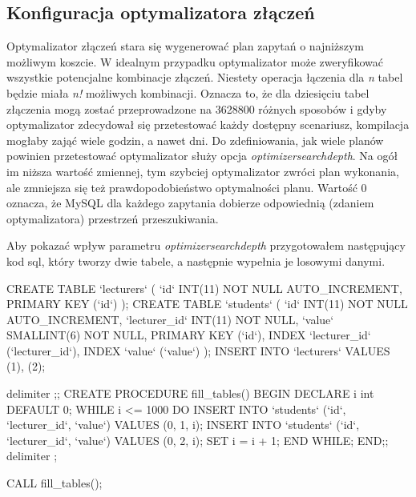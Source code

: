\subsection{Konfiguracja optymalizatora złączeń}
Optymalizator złączeń stara się wygenerować plan zapytań o najniższym możliwym koszcie. W idealnym przypadku optymalizator może zweryfikować wszystkie potencjalne kombinacje złączeń. Niestety operacja łączenia dla \textit{n} tabel będzie miała \textit{n!} możliwych kombinacji. Oznacza to, że dla dziesięciu tabel złączenia mogą zostać przeprowadzone na 3628800 różnych sposobów i gdyby optymalizator zdecydował się przetestować każdy dostępny scenariusz, kompilacja mogłaby zająć wiele godzin, a nawet dni. Do zdefiniowania, jak wiele planów powinien przetestować optymalizator służy opcja \textit{optimizer\textunderscore search\textunderscore depth}. Na ogół im niższa wartość zmiennej, tym szybciej optymalizator zwróci plan wykonania, ale zmniejsza się też prawdopodobieństwo optymalności planu. Wartość 0 oznacza, że MySQL dla każdego zapytania dobierze odpowiednią (zdaniem optymalizatora) przestrzeń przeszukiwania.

Aby pokazać wpływ parametru \textit{optimizer\textunderscore search\textunderscore depth} przygotowałem następujący kod sql, który tworzy dwie tabele, a następnie wypełnia je losowymi danymi.

\begin{spverbatim}
	CREATE TABLE `lecturers`
	(
	`id` INT(11) NOT NULL AUTO_INCREMENT,
	PRIMARY KEY (`id`)
	);
	CREATE TABLE `students`
	(
	`id` INT(11) NOT NULL AUTO_INCREMENT,
	`lecturer_id` INT(11) NOT NULL,
	`value` SMALLINT(6) NOT NULL,
	PRIMARY KEY (`id`),
	INDEX `lecturer_id` (`lecturer_id`),
	INDEX `value` (`value`)
	);
	INSERT INTO `lecturers` VALUES (1), (2);
	
	delimiter ;;
	CREATE PROCEDURE fill_tables()
	BEGIN
	DECLARE i int DEFAULT 0;
	WHILE i <= 1000 DO
	INSERT INTO `students` (`id`, `lecturer_id`, `value`) VALUES (0, 1, i);
	INSERT INTO `students` (`id`, `lecturer_id`, `value`) VALUES (0, 2, i);
	SET i = i + 1;
	END WHILE;
	END;;
	delimiter ;
	
	CALL fill_tables();
\end{spverbatim}

